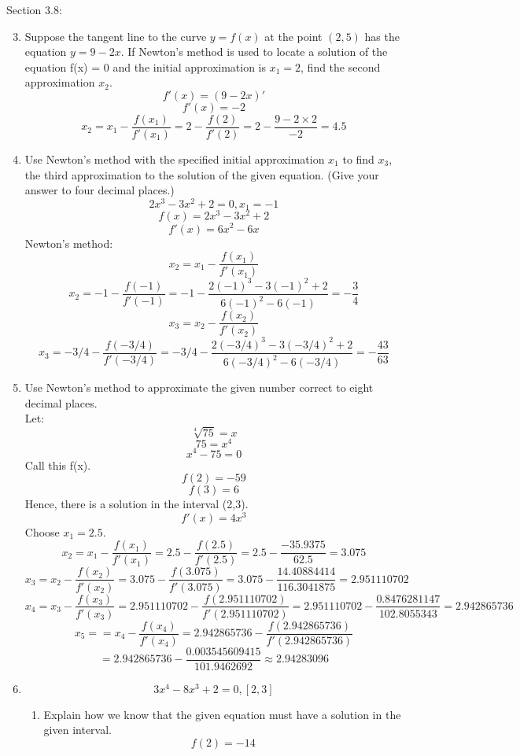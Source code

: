 \documentclass[12pt]{article}
\begin{document}
Section 3.8:
\begin{enumerate}
    \setcounter{enumi}{2}
    \item Suppose the tangent line to the curve $y = f(x)$ at the point $(2,5)$ has the equation $y = 9-2x$. If Newton’s method is used to locate a solution of the equation f(x) = 0 and the initial approximation is $x_1 = 2$, find the second approximation $x_2$.
    \[f'(x) = (9-2x)'\]
    \[f'(x) = -2\]
    \[x_2 = x_1 - \frac{f(x_1)}{f'(x_1)} = 2 - \frac{f(2)}{f'(2)} = 2 - \frac{9 - 2\times 2}{-2} = 4.5\]
    \setcounter{enumi}{5}
    \item Use Newton’s method with the specified initial approximation $x_1$ to find $x_3$, the third approximation to the solution of the given equation. (Give your answer to four decimal places.)
    \[2x^3 - 3x^2 + 2 = 0, x_1 = -1\]
    \[f(x) = 2x^3 - 3x^2 + 2 \]
    \[f'(x) = 6x^2 - 6x\]
    Newton's method:
    \[x_2 = x_1 - \frac{f(x_1)}{f'(x_1)}\]
    \[x_2 = -1 - \frac{f(-1)}{f'(-1)} = -1 - \frac{2(-1)^3 - 3(-1)^2 + 2}{6(-1)^2 - 6(-1)} = -\frac{3}{4}\]
    \[x_3 = x_2 - \frac{f(x_2)}{f'(x_2)}\]
    \[x_3 = -3/4 - \frac{f(-3/4)}{f'(-3/4)} = -3/4 - \frac{2(-3/4)^3 - 3(-3/4)^2 + 2}{6(-3/4)^2 - 6(-3/4)} = -\frac{43}{63}\]
    \setcounter{enumi}{10}
    \item Use Newton’s method to approximate the given number correct to eight decimal places.\\
    Let:
    \[\sqrt[4]{75} = x\]
    \[75 = x^4\]
    \[x^4 - 75 = 0\]
    Call this f(x).
    \[f(2) = -59\]
    \[f(3) = 6\]
    Hence, there is a solution in the interval (2,3).
    \[f'(x) = 4x^3\]
    Choose $x_1 = 2.5$.
    \[x_2 = x_1 - \frac{f(x_1)}{f'(x_1)} = 2.5 - \frac{f(2.5)}{f'(2.5)} = 2.5 - \frac{-35.9375}{62.5} = 3.075\]
    \[x_3 = x_2 - \frac{f(x_2)}{f'(x_2)} = 3.075 - \frac{f(3.075)}{f'(3.075)} = 3.075 - \frac{14.40884414}{116.3041875} = 2.951110702\]
    \[x_4 = x_3 - \frac{f(x_3)}{f'(x_3)} = 2.951110702 - \frac{f(2.951110702)}{f'(2.951110702)} = 2.951110702 - \frac{0.8476281147}{102.8055343} = 2.942865736\] 
    \[x_5 = = x_4 - \frac{f(x_4)}{f'(x_4)} = 2.942865736 - \frac{f(2.942865736)}{f'(2.942865736)}\] 
    \[ = 2.942865736 - \frac{0.003545609415}{101.9462692} \approx 2.94283096\]    
    \setcounter{enumi}{12}
    \item
    \[3x^4 - 8x^3 + 2 = 0, [2,3]\]
    \begin{enumerate}
        \item Explain how we know that the given equation must have a solution in the given interval.
        \[f(2) = -14\]

\end{enumerate}
\end{enumerate}
\end{document}
